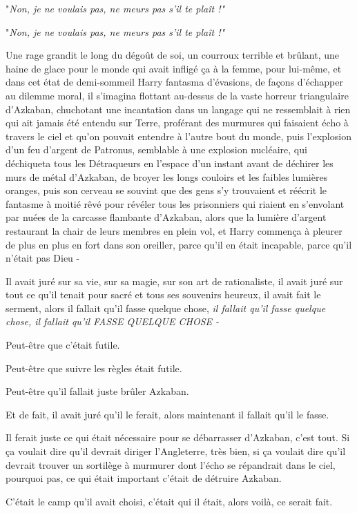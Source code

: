 "\emph{Non, je ne voulais pas, ne meurs pas s'il te plaît !"} 

"\emph{Non, je ne voulais pas, ne meurs pas s'il te plaît !"} 

Une rage grandit le long du dégoût de soi, un courroux terrible et brûlant, une haine de glace pour le monde qui avait infligé ça à la femme, pour lui-même, et dans cet état de demi-sommeil Harry fantasma d'évasions, de façons d'échapper au dilemme moral, il s'imagina flottant au-dessus de la vaste horreur triangulaire d'Azkaban, chuchotant une incantation dans un langage qui ne ressemblait à rien qui ait jamais été entendu sur Terre, proférant des murmures qui faisaient écho à travers le ciel et qu'on pouvait entendre à l'autre bout du monde, puis l'explosion d'un feu d'argent de Patronus, semblable à une explosion nucléaire, qui déchiqueta tous les Détraqueurs en l'espace d'un instant avant de déchirer les murs de métal d'Azkaban, de broyer les longs couloirs et les faibles lumières oranges, puis son cerveau se souvint que des gens s'y trouvaient et réécrit le fantasme à moitié rêvé pour révéler tous les prisonniers qui riaient en s'envolant par nuées de la carcasse flambante d'Azkaban, alors que la lumière d'argent restaurant la chair de leurs membres en plein vol, et Harry commença à pleurer de plus en plus en fort dans son oreiller, parce qu'il en était incapable, parce qu'il n'était pas Dieu -

Il avait juré sur sa vie, sur sa magie, sur son art de rationaliste, il avait juré sur tout ce qu'il tenait pour sacré et tous ses souvenirs heureux, il avait fait le serment, alors il fallait qu'il fasse quelque chose, \emph{il fallait qu'il fasse quelque chose, il fallait qu'il FASSE QUELQUE CHOSE -} 

Peut-être que c'était futile.

Peut-être que suivre les règles était futile.

Peut-être qu'il fallait juste brûler Azkaban.

Et de fait, il avait juré qu'il le ferait, alors maintenant il fallait qu'il le fasse.

Il ferait juste ce qui était nécessaire pour se débarrasser d'Azkaban, c'est tout. Si ça voulait dire qu'il devrait diriger l'Angleterre, très bien, si ça voulait dire qu'il devrait trouver un sortilège à murmurer dont l'écho se répandrait dans le ciel, pourquoi pas, ce qui était important c'était de détruire Azkaban.

C'était le camp qu'il avait choisi, c'était qui il était, alors voilà, ce serait fait.

